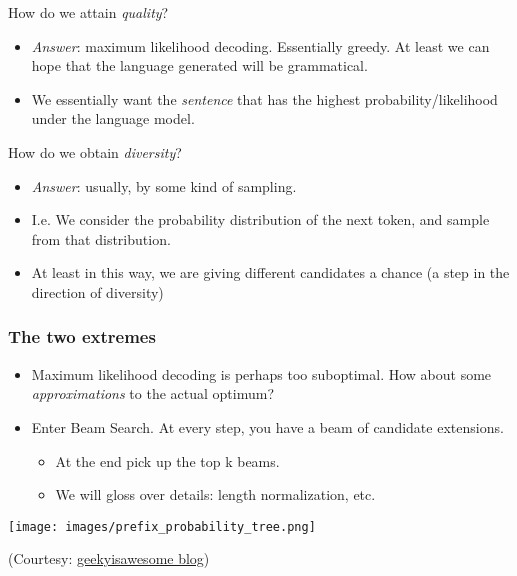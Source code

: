 \documentclass[11pt]{beamer}
\begin{document}
\begin{frame}
  How do we attain {\em quality}?

\begin{itemize}
  \item
  {\em Answer}: maximum likelihood decoding. Essentially greedy.
  At least we can hope that the language generated will be
  grammatical.
\item
  We essentially want the {\em sentence} that has the highest probability/likelihood
  under the language model.
\end{itemize}
\end{frame}


\begin{frame}
  How do we obtain {\em diversity}?
\begin{itemize}
  \item
  {\em Answer}: usually, by some kind of sampling.
\item
  I.e. We consider the probability distribution of the next token, and sample from that
  distribution.
\item
  At least in this way, we are giving different candidates a chance (a step
  in the direction of diversity)
\end{itemize}
\end{frame}

\begin{frame}
  \frametitle{The two extremes}
  \begin{itemize}
    \item Maximum likelihood decoding is perhaps too suboptimal. How about some
    {\em approximations} to the actual optimum?
    \item Enter Beam Search. At every step, you have a beam of candidate extensions.
    \begin{itemize}
    \item At the
    end pick up the top k beams.
    \item We will gloss over details: length normalization, etc.
    \end{itemize}
\end{itemize}
\end{frame}

\begin{frame}
\begin{center}
\texttt{[image: images/prefix\_probability\_tree.png]}
\end{center}
(Courtesy: \href{https://geekyisawesome.blogspot.com/2016/10/using-beam-search-to-generate-most.html}{geekyisawesome blog})
\end{frame}
\end{document}
